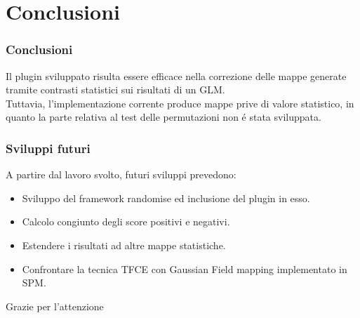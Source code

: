 \documentclass{beamer}
\begin{document}
\section{Conclusioni}
\begin{frame}
\frametitle{Conclusioni}
Il plugin sviluppato risulta essere efficace nella correzione delle mappe generate tramite contrasti statistici sui risultati di un GLM.\\

\bigskip
Tuttavia, l'implementazione corrente produce mappe prive di valore statistico, in quanto la parte relativa al test delle permutazioni non \'e stata sviluppata.
\end{frame}

\begin{frame}
\frametitle{Sviluppi futuri}
A partire dal lavoro svolto, futuri sviluppi prevedono:
\begin{itemize}
\item Sviluppo del framework randomise ed inclusione del plugin in esso.
\item Calcolo congiunto degli score positivi e negativi.
\item Estendere i risultati ad altre mappe statistiche.
\item Confrontare la tecnica TFCE con Gaussian Field mapping implementato in SPM.
\end{itemize}
\end{frame}

\begin{frame}
\centering
\huge{Grazie per l'attenzione}
\end{frame}
\end{document}
